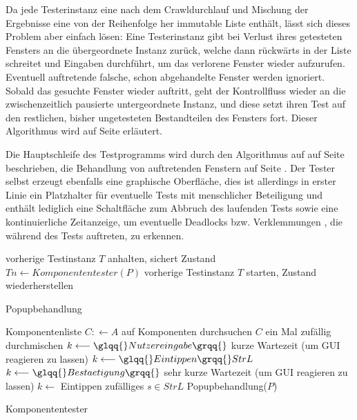 Da jede Testerinstanz
eine nach dem Crawldurchlauf und Mischung der Ergebnisse eine von 
der Reihenfolge her immutable Liste enthält, lässt sich dieses Problem aber
einfach lösen: Eine Testerinstanz gibt bei Verlust ihres getesteten Fensters
an die übergeordnete Instanz zurück, welche dann rückwärts in der Liste
schreitet und Eingaben durchführt, um das verlorene Fenster wieder aufzurufen.
Eventuell auftretende falsche, schon abgehandelte Fenster werden ignoriert.
Sobald das gesuchte Fenster wieder auftritt, geht der Kontrollfluss wieder an
die zwischenzeitlich pausierte untergeordnete Instanz, und diese setzt ihren
Test auf den restlichen, bisher ungetesteten Bestandteilen des Fensters fort.
Dieser Algorithmus wird auf Seite \pageref{alg:autotesterwindowloss} erläutert.

Die Hauptschleife des Testprogramms wird durch den Algorithmus auf auf Seite 
\pageref{alg:autotestermain} beschrieben, die Behandlung von auftretenden
Fenstern auf Seite \pageref{alg:autotesterpopup}. Der Tester selbst erzeugt
ebenfalls eine graphische Oberfläche, dies ist allerdings in erster Linie
ein Platzhalter für eventuelle Tests mit menschlicher Beteiligung und enthält
lediglich eine Schaltfläche zum Abbruch des laufenden Tests sowie eine
kontinuierliche Zeitanzeige, um eventuelle Deadlocks bzw. Verklemmungen \cite{deadlocks},
die während des Tests auftreten, zu erkennen.


\begin{algorithm} \SetAlgoLined
	vorherige Testinstanz $T$ anhalten, sichert Zustand\;
	$Tn \longleftarrow Komponententester(P)$\;
	vorherige Testinstanz $T$ starten, Zustand wiederherstellen\;
	\caption{Popupbehandlung}
	\label{alg:autotesterpopup}
\end{algorithm}

\begin{algorithm} \SetAlgoLined
	Komponentenliste $C: \longleftarrow A$ auf Komponenten durchsuchen\;
	$C$ ein Mal zufällig durchmischen\;
	{
		{
			$k \longleftarrow \glqq{}Nutzereingabe\grqq{}$\;
			kurze Wartezeit (um GUI reagieren zu lassen)
		}
		{
			{
				$k \longleftarrow \glqq{}Eintippen\grqq{} StrL$\;
				$k \longleftarrow \glqq{}Bestaetigung\grqq{}$\;
				sehr kurze Wartezeit (um GUI reagieren zu lassen)
			}
			$k \longleftarrow$ \glqq{}Eintippen\grqq{} zufälliges $s \in StrL$\;
		}
		{
			Popupbehandlung($P$)\;
		}
	}
	\caption{Komponententester}
	\label{alg:autotestermain}
\end{algorithm}

